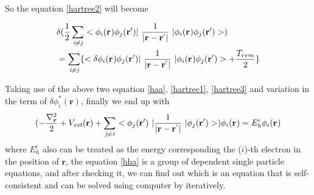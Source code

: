 \documentclass[a4paper]{report}
\begin{document}
\noindent So the equation \ref{hartree2} will become 

\begin{equation}\begin{split}\label{hartree3}
&  \delta( \frac{1}{2} \suminj<i><j> <\bwf<i><> \bwfn<j><'>|\ \frac{1}{|\textbf{r} - \textbf{r}^{'} |} \ | \bwf<i><> \bwfn<j><'>>)   \\
& =  \suminj<i><j> \{  <\delta \bwf<i><> \bwfn<j><'>|\ \frac{1}{|\textbf{r} - \textbf{r}^{'} |} \ | \bwf<i><> \bwfn<j><'>> + \frac{T_{rem}}{2}\}
\end{split}\end{equation}


Taking use of the above two equation \ref{haa}, \ref{hartree1}, \ref{hartree3} and variation in the term of  $\delta \phi^{*}_{i}(\textbf{r}{}) $,
finally we end up with
\begin{equation}\label{hha}
(-\frac{\nabla^{2}_{\textbf r}}{2} + V_\textit{ext}(\textbf{r})+ \suminj<j><i> <\bwfn<j><'>\ | \frac{1}{|\textbf{r} - \textbf{r}^{'} |} \ | \bwfn<j><'>>) \bwf<i><> = E^{i}_{h} \bwf<i><>
\end{equation}
\noindent where $E^{i}_{h}$  also can be treated as the energy corresponding the ($i$)-th electron in the position of  $\textbf{r}$, the equation \ref{hha} is a group of dependent single
 particle equations, and after checking it, we can find out which is an equation that is self-consistent and can be solved using
 computer by iteratively.

\end{document}
